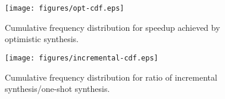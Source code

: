 %
%
\begin{figure}
	\texttt{[image: figures/opt-cdf.eps]}
	\caption{Cumulative frequency distribution for speedup achieved by optimistic synthesis.}
	\label{fig:opt-cdf}
\end{figure}
\begin{figure}
	\texttt{[image: figures/incremental-cdf.eps]}
	\caption{Cumulative frequency distribution for ratio of incremental synthesis/one-shot synthesis.}
	\label{fig:incremental-cdf}
\end{figure}




